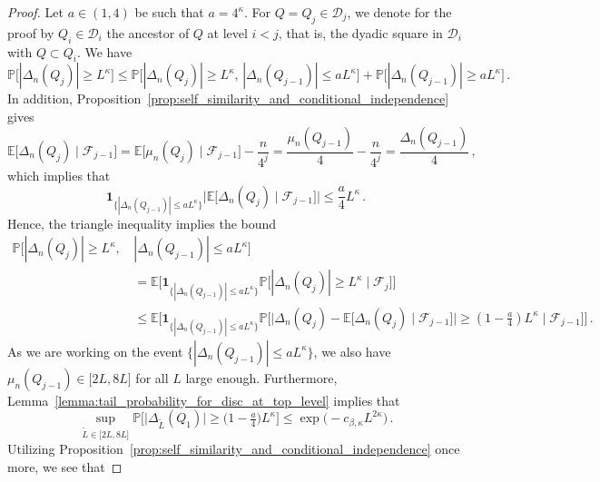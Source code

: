 \documentclass[11pt]{amsart}
\theoremstyle{definition}
\theoremstyle{remark}
\numberwithin{equation}{section}
\newcommand{\bP}{\mathbb P}
\newcommand{\bE}{\mathbb E}
\begin{document}
	\begin{proof}
		Let $a\in (1,4)$ be such that $a = 4^\kappa$. For $Q=Q_j\in\mathcal{D}_j$, we denote for the proof by $Q_i\in \mathcal{D}_i$ the ancestor of $Q$ at level $i<j$, that is, the dyadic square in $\mathcal{D}_i$ with $Q\subset Q_i$. We have
		\begin{equation}
			\label{eq:concetration_on_dyadic_cubes_first_split}
			\bP\big[|\Delta_n(Q_{j})| \ge L^\kappa\big] \le \bP\big[|\Delta_n(Q_j)| \ge L^\kappa, \, |\Delta_n(Q_{j-1})| \le aL^\kappa \big] + \bP\big[|\Delta_n(Q_{j-1})| \ge aL^\kappa\big] \, .
		\end{equation}
		In addition, Proposition~\ref{prop:self_similarity_and_conditional_independence} gives
		\begin{equation*}
			\bE\big[\Delta_n(Q_j) \mid \mathcal{F}_{j-1}\big] = \bE\big[\mu_n(Q_j) \mid \mathcal{F}_{j-1}\big] - \frac{n}{4^j} = \frac{\mu_n(Q_{j-1})}{4}  - \frac{n}{4^j} = \frac{\Delta_n(Q_{j-1})}{4}  \, ,
		\end{equation*}
		which implies that
		\[
		\mathbf{1}_{\{|\Delta_n(Q_{j-1})| \le aL^\kappa\}}\big|\bE\big[\Delta_n(Q_j) \mid \mathcal{F}_{j-1}\big]\big| \le \frac{a}{4} L^{\kappa} \, .
		\]
		Hence, the triangle inequality implies the bound 
		\begin{align*}
			\bP\big[|\Delta_n(Q_j)| \ge L^\kappa, \, &|\Delta_n(Q_{j-1})| \le aL^\kappa \big] \\ &= \bE\big[ \mathbf{1}_{\{|\Delta_n(Q_{j-1})| \le aL^\kappa\}} \bP\big[|\Delta_n(Q_j)| \ge L^\kappa \mid\mathcal{F}_j\big] \big] \\ &\le \bE\Big[ \mathbf{1}_{\{|\Delta_n(Q_{j-1})| \le aL^\kappa\}} \bP\Big[ \big|\Delta_n(Q_j)-\bE\big[\Delta_n(Q_j)\mid\mathcal{F}_{j-1}\big]\big| \ge (1-\tfrac{a}{4}) L^{\kappa} \mid \mathcal{F}_{j-1}\Big]\Big] \, .
		\end{align*}
		As we are working on the event $\{|\Delta_n(Q_{j-1})| \le aL^\kappa\}$, we also have $\mu_n(Q_{j-1}) \in \big[2L,8L\big]$ for all $L$ large enough. Furthermore, Lemma~\ref{lemma:tail_probability_for_disc_at_top_level} implies that 
		\begin{equation}
			\label{eq:sub-gaussian_tail_of_tilde_L_many_points}
			\sup_{\widetilde{L} \in \big[2L,8L\big]} \bP\Big[\big|\Delta_{\widetilde{L}}(Q_1) \big| \ge \big(1-\tfrac{a}{4}\big) L^{\kappa} \Big] \le \exp\Big(-c_{\beta,\kappa} L^{2\kappa}\Big) \, .
		\end{equation}
		Utilizing Proposition~\ref{prop:self_similarity_and_conditional_independence} once more, we see that  

\end{proof}
\end{document}
